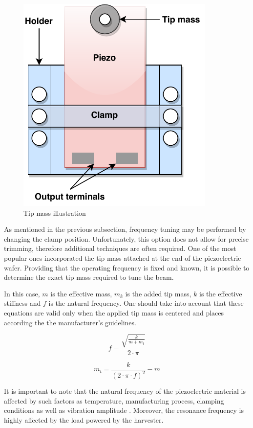 \documentclass[12pt,a4paper]{article}
\begin{document}
\begin{figure}[ht!]
\includegraphics[scale=0.85]{tipmass.pdf}
\caption{Tip mass illustration}
\label{fig:tipmass}
\end{figure}

As mentioned in the previous subsection, frequency tuning may be performed by changing the clamp position. Unfortunately, this option does not allow for precise trimming, therefore additional techniques are often required. One of the most popular ones incorporated the tip mass attached at the end of the piezoelectric wafer. Providing that the operating frequency is fixed and known, it is possible to determine the exact tip mass required to tune the beam.
\par

In this case, $m$ is the effective mass, $m_k$ is the added tip mass, $k$ is the effective stiffness and $f$ is the natural frequency. One should take into account that these equations are valid only when the applied tip mass is centered and places according the the manufacturer's guidelines.

\begin{equation}
    f = \frac{\sqrt{\frac{k}{m + m_{t}}}}{2\cdot\pi}
    \label{resonant1}
\end{equation}

\begin{equation}
    m_{t} = \frac{k}{(2\cdot\pi\cdot f)^2} - m
    \label{resonant2}
\end{equation}

It is important to note that the natural frequency of the piezoelectric material is affected by such factors as temperature, manufacturing process, clamping conditions as well as vibration amplitude \cite{PPA}. Moreover, the resonance frequency is highly affected by the load powered by the harvester. 
\par
\end{document}
